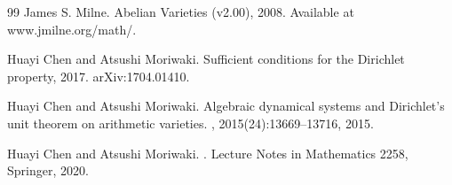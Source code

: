 \documentclass[10pt,a4paper]{amsart}
\theoremstyle{plain}
\theoremstyle{plain}
\numberwithin{equation}{section}
\begin{document}
\begin{thebibliography}{99}
		James S. Milne.
		\newblock Abelian Varieties (v2.00), 2008.
		\newblock Available at www.jmilne.org/math/.
		
		Huayi Chen and Atsushi Moriwaki.
		\newblock Sufficient conditions for the Dirichlet property, 2017.
		\newblock arXiv:1704.01410.
		
		Huayi Chen and Atsushi Moriwaki.
		\newblock Algebraic dynamical systems and Dirichlet's unit theorem on arithmetic varieties.
		, 2015(24):13669--13716, 2015.
		
		Huayi Chen and Atsushi Moriwaki.
		.
		\newblock Lecture Notes in Mathematics 2258, Springer, 2020.
		
	\end{thebibliography}
\end{document}
